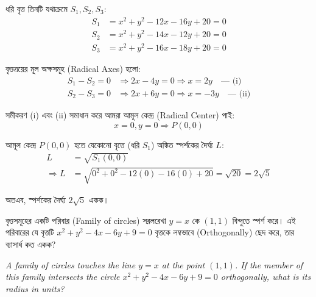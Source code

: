 \documentclass[12pt, a4paper]{article}
\begin{document}
\begin{tcolorbox}[solutionbox={সমাধান (Solution)}]
    \noindent
    ধরি বৃত্ত তিনটি যথাক্রমে $S_1, S_2, S_3$:
    \begin{align*}
        S_1 &= x^2 + y^2 - 12x - 16y + 20 = 0 \\
        S_2 &= x^2 + y^2 - 14x - 12y + 20 = 0 \\
        S_3 &= x^2 + y^2 - 16x - 18y + 20 = 0
    \end{align*}
    
    \vspace{0.5em}
    বৃত্তত্রয়ের মূল অক্ষসমূহ (Radical Axes) হলো:
    \begin{align*}
        S_1 - S_2 = 0 &\Rightarrow 2x - 4y = 0 \Rightarrow x = 2y \quad \text{--- (i)} \\
        S_2 - S_3 = 0 &\Rightarrow 2x + 6y = 0 \Rightarrow x = -3y \quad \text{--- (ii)}
    \end{align*}
    
    \vspace{0.5em}
    সমীকরণ (i) এবং (ii) সমাধান করে আমরা আমূল কেন্দ্র (Radical Center) পাই:
    \[ x = 0, y = 0 \Rightarrow P(0, 0) \]
    
    \vspace{0.5em}
    আমূল কেন্দ্র $P(0, 0)$ হতে যেকোনো বৃত্তে (ধরি $S_1$) অঙ্কিত স্পর্শকের দৈর্ঘ্য $L$:
    \begin{align*}
        L &= \sqrt{S_1(0, 0)} \\
        \Rightarrow L &= \sqrt{0^2 + 0^2 - 12(0) - 16(0) + 20} = \sqrt{20} = 2\sqrt{5}
    \end{align*}
    
    \vspace{0.5em}
    অতএব, স্পর্শকের দৈর্ঘ্য $2\sqrt{5}$ একক।
\end{tcolorbox}

\vspace{2em}

\begin{tcolorbox}[questionbox={প্রশ্ন (Question) 18}]
    \noindent
    বৃত্তসমূহের একটি পরিবার (Family of circles) সরলরেখা $y = x$ কে $(1, 1)$ বিন্দুতে স্পর্শ করে। এই পরিবারের যে বৃত্তটি $x^2 + y^2 - 4x - 6y + 9 = 0$ বৃত্তকে লম্বভাবে (Orthogonally) ছেদ করে, তার ব্যাসার্ধ কত একক?
    
    \vspace{0.8em}
    \begin{english}
    \noindent\textit{\color{darkgray}
    A family of circles touches the line $y = x$ at the point $(1, 1)$. If the member of this family intersects the circle $x^2 + y^2 - 4x - 6y + 9 = 0$ orthogonally, what is its radius in units?
    }
    \end{english}
\end{tcolorbox}
\end{document}
